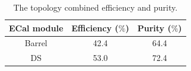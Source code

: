 \begin{table}
  \begin{tabular}{ c c c}
    ECal module & Efficiency ($\%$) & Purity ($\%$) \\ \hline \hline
    Barrel & 42.4 & 64.4 \\
    DS & 53.0  & 72.4 \\
  \end{tabular}
  \caption{The topology combined efficiency and purity.}
  \label{table:FinalEffPur}
\end{table}





